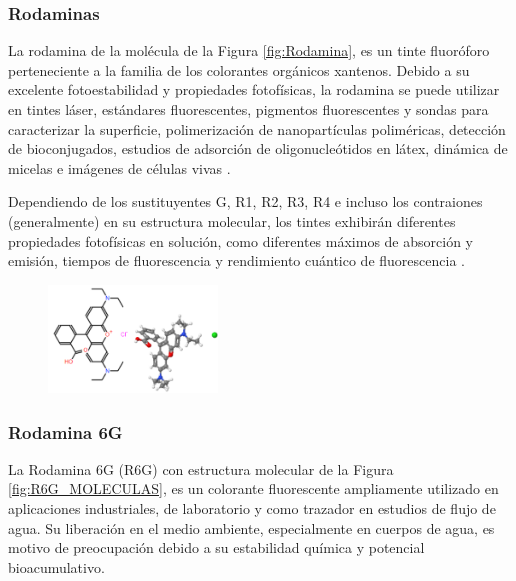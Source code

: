 \documentclass[12pt]{article}
\begin{document}
    \subsubsection{Rodaminas} 
    La rodamina de la molécula de la Figura \ref{fig:Rodamina}, es un tinte fluoróforo perteneciente a la familia de los colorantes orgánicos xantenos. Debido a su excelente fotoestabilidad y propiedades fotofísicas, la rodamina se puede utilizar en tintes láser, estándares fluorescentes, pigmentos fluorescentes y sondas para caracterizar la superficie, polimerización de nanopartículas poliméricas, detección de bioconjugados, estudios de adsorción de oligonucleótidos en látex, dinámica de micelas e imágenes de células vivas \cite{IEEEreferencias:XANTENOS}. \vspace{1em} %
    
    Dependiendo de los sustituyentes G, R1, R2, R3, R4 e incluso los contraiones (generalmente) en su estructura molecular, los tintes exhibirán diferentes propiedades fotofísicas en solución, como diferentes máximos de absorción y emisión, tiempos de fluorescencia y rendimiento cuántico de fluorescencia \cite{IEEEreferencias:XANTENOS}.

\begin{figure}[H]
    	   \begin{center}
     	  	\includegraphics[width = 0.4\textwidth]{Imagenes/Rodamina_Molecula (2).png}
            \end{center} 
        \end{figure}

 
    \subsubsection{Rodamina 6G}


La Rodamina 6G (R6G) con estructura molecular de la Figura \ref{fig:R6G_MOLECULAS}, es un colorante fluorescente ampliamente utilizado en aplicaciones industriales, de laboratorio y como trazador en estudios de flujo de agua. Su liberación en el medio ambiente, especialmente en cuerpos de agua, es motivo de preocupación debido a su estabilidad química y potencial bioacumulativo.\vspace{1em} %
\end{document}
